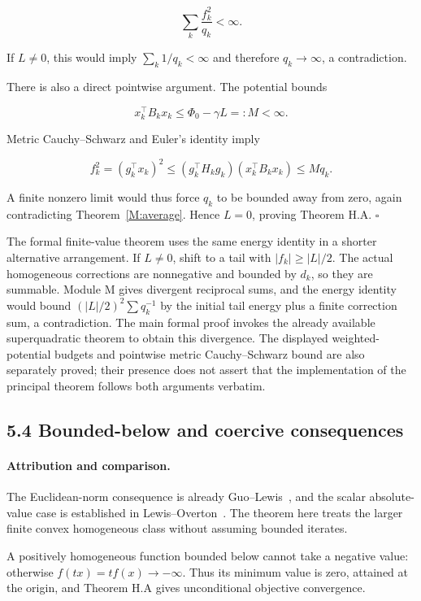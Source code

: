 \[
\sum_k\frac{f_k^2}{q_k}<\infty.
\]

If \(L\ne0\), this would imply \(\sum_k1/q_k<\infty\) and therefore
\(q_k\to\infty\), a contradiction.

There is also a direct pointwise argument. The potential bounds

\[
x_k^\top B_kx_k\le\Phi_0-\gamma L=:M<\infty.
\]

Metric Cauchy--Schwarz and Euler's identity imply

\[
f_k^2=(g_k^\top x_k)^2
\le(g_k^\top H_kg_k)(x_k^\top B_kx_k)
\le Mq_k.
\]

A finite nonzero limit would thus force \(q_k\) to be bounded away from
zero, again contradicting Theorem~\ref{M:average}. Hence \(L=0\), proving Theorem H.A.
\(\square\)

The formal finite-value theorem uses the same energy identity in a shorter alternative arrangement. If \(L\ne0\), shift to a tail with \(|f_k|\ge|L|/2\). The actual homogeneous corrections are nonnegative and bounded by \(d_k\), so they are summable. Module M gives divergent reciprocal sums, and the energy identity would bound \((|L|/2)^2\sum q_k^{-1}\) by the initial tail energy plus a finite correction sum, a contradiction. The main formal proof invokes the already available superquadratic theorem to obtain this divergence. The displayed weighted-potential budgets and pointwise metric Cauchy--Schwarz bound are also separately proved; their presence does not assert that the implementation of the principal theorem follows both arguments verbatim.

\subsection{5.4 Bounded-below and coercive
consequences}\label{H:bounded-below-and-coercive-consequences}
\paragraph{Attribution and comparison.}
The Euclidean-norm consequence is already Guo--Lewis~\cite[Corollary~4.2]{GL18}, and the scalar absolute-value case is established in Lewis--Overton~\cite[Section~5.1]{LO}. The theorem here treats the larger finite convex homogeneous class without assuming bounded iterates.


A positively homogeneous function bounded below cannot take a negative
value: otherwise \(f(tx)=tf(x)\to-\infty\). Thus its minimum value is
zero, attained at the origin, and Theorem H.A gives unconditional
objective convergence.

